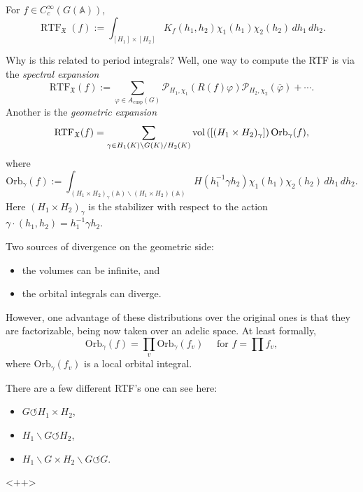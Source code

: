 \documentclass[reqno]{amsart} 
\numberwithin{theorem}{section}
\numberwithin{equation}{section}
\numberwithin{exercise}{section}
\begin{document}
\begin{definition}\label{definition:cq6thqam4a}
  For $f \in C_c^\infty(G(\mathbb{A}))$,
  \begin{equation*}
    \operatorname{RTF}_{\mathfrak{X}}(f) := \int_{[H_1] \times[H_2]} K_f(h_1, h_2) \chi_1(h_1) \chi_2(h_2)
    \, d h_1 \, d h_2.
  \end{equation*}
\end{definition}
Why is this related to period integrals?  Well, one way to compute the RTF is via the \emph{spectral expansion}
\begin{equation*}
  \mathrm{RTF}_{\mathfrak{X}}(f) := \sum_{\varphi \in A_{\mathrm{cusp}}(G)}
  \mathcal{P}_{H_1, \chi_1}(R(f) \varphi)
  \mathcal{P}_{H_2, \chi_2}(\overline{\varphi})
  + \dotsb.
\end{equation*}
Another is the \emph{geometric expansion}
\begin{equation*}
  \mathrm{RTF}_{\mathfrak{X}}(f) = \sum_{\gamma \in H_1(K) \backslash G(K) / H_2(K)}
  \operatorname{vol} \left([(H_1 \times H_2)_\gamma] \right) \mathrm{Orb}_\gamma(f),
\end{equation*}
where
\begin{equation*}
  \mathrm{Orb}_\gamma(f) := 
  \int_{(H_1 \times H_2)_\gamma(\mathbb{A}) \backslash (H_1 \times H_2)(\mathbb{A})}
  H(h_1^{-1} \gamma h_2)
  \chi_1(h_1) \chi_2(h_2)
  \, d h_1
  \, d h_2.
\end{equation*}
Here $(H_1 \times H_2)_\gamma$ is the stabilizer with respect to the action $\gamma \cdot(h_1, h_2) = h_1^{-1} \gamma h_2$.

\begin{remark}\label{remark:cq6thubzrk}
  Two sources of divergence on the geometric side:
  \begin{itemize}
  \item the volumes can be infinite, and
  \item the orbital integrals can diverge.
  \end{itemize}
  However, one advantage of these distributions over the original ones is that they are factorizable, being now taken over an adelic space.  At least formally,
  \begin{equation*}
    \mathrm{Orb}_\gamma(f) = \prod_v \mathrm{Orb}_\gamma(f_v) \quad \text{ for } f = \prod f_v,
  \end{equation*}
  where $\mathrm{Orb}_\gamma(f_v)$ is a local orbital integral.
\end{remark}

\begin{remark}\label{remark:cq6th778hd}
  There are a few different RTF's one can see here:
  \begin{itemize}
  \item $G \circlearrowleft H_1 \times H_2$,
  \item $H_1 \backslash G \circlearrowleft H_2$,
  \item $H_1 \backslash G \times H_2 \backslash G \circlearrowleft G$.
  \end{itemize}
\end{remark}<++>
\end{document}
